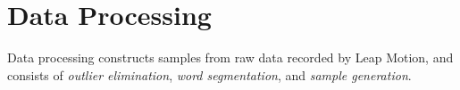 
\section{Data Processing}
\label{sec:data}

Data processing constructs samples from raw data recorded by Leap Motion, and consists of \textit{outlier elimination}, \textit{word segmentation}, and \textit{sample generation}. 






